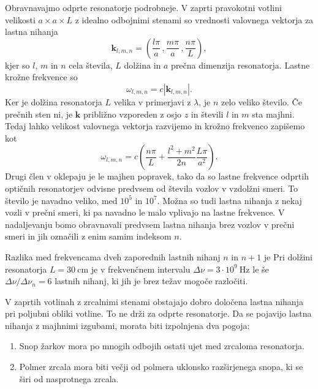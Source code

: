 Obravnavajmo odprte resonatorje podrobneje. V zaprti pravokotni votlini velikosti
$a\times a\times L$ z idealno odbojnimi stenami so vrednosti
valovnega vektorja za lastna nihanja 
\begin{equation}
\mathbf{k}_{l,m,n}=\left(\frac{l\pi}{a}\,,\frac{m\pi}{a}\,,\frac{n\pi}{L}\right),\label{eq:k-votlina}
\end{equation}
kjer so $l$, $m$ in $n$ cela števila, $L$ dolžina in $a$ prečna
dimenzija resonatorja. Lastne krožne frekvence so 
\begin{equation}
\omega_{l,m,n}=c|\mathbf{k}_{l,m,n}|.\label{eq:omega-votlina}
\end{equation}
Ker je dolžina resonatorja $L$ velika v primerjavi z $\lambda$, je $n$
zelo veliko število. Če prečnih sten ni, je  $\mathbf{k}$ približno
vzporeden z osjo $z$ in števili $l$ in $m$ sta majhni. Tedaj
lahko velikost valovnega vektorja razvijemo in krožno frekvenco zapišemo kot
\begin{equation}
\omega_{l,m,n}=c\left(\frac{n\pi}{L}+\frac{l^{2}+m^{2}}{2n}\frac{L \pi}{a^{2}}\right).
\label{eq:delta-omega-resonator-razvoj}
\end{equation}
Drugi člen v oklepaju je le majhen popravek, tako da so
lastne frekvence odprtih optičnih resonatorjev odvisne predvsem od
števila vozlov v vzdolžni smeri. To število je navadno veliko, med $10^{5}$
in $10^{7}$. Možna so tudi lastna nihanja z nekaj vozli v prečni
smeri, ki pa navadno le malo vplivajo na lastne frekvence. V nadaljevanju
bomo obravnavali predvsem lastna nihanja brez vozlov v prečni smeri in
jih označili z enim samim indeksom $n$.

Razlika med frekvencama dveh zaporednih lastnih nihanj 
$n$ in $n+1$ je
Pri dolžini resonatorja $L=30~\si{\centi\metre}$ je v frekvenčnem
intervalu $\Delta \nu = 3\cdot10^{9}~\si{\hertz}$ le še $\Delta \nu /\Delta \nu_n = 6$ lastnih 
nihanj, ki jih je brez težav mogoče razločiti.

V zaprtih votlinah z zrcalnimi stenami obstajajo dobro določena lastna
nihanja pri poljubni obliki votline. To ne drži za odprte resonatorje.
Da se pojavijo lastna nihanja z majhnimi izgubami, morata
biti izpolnjena dva pogoja:

\begin{enumerate} 
\item Snop žarkov mora po mnogih odbojih ostati ujet med zrcaloma resonatorja.
\item Polmer zrcala mora biti večji od polmera uklonsko razširjenega snopa, ki se širi od nasprotnega zrcala. 
\end{enumerate}

